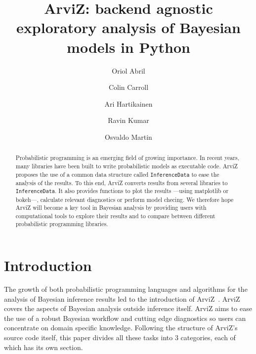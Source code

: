 \documentclass[anonymous=false, %
               format=acmsmall, %
               review=true, %
               screen=true, %
               nonacm=true]{acmart}
\begin{document}
\title{{ArviZ}: backend agnostic exploratory analysis of
{Bayesian} models in {Python}}

\author{Oriol Abril}

\author{Colin Carroll}

\author{Ari Hartikainen}

\author{Ravin Kumar}

\author{Osvaldo Martin}

\begin{abstract}
  Probabilistic programming is an emerging field of growing importance. In
  recent years, many libraries have been built to write probabilistic models
  as executable code. ArviZ proposes the use of a common data structure called
  \texttt{InferenceData} to ease the analysis of the results. To this end,
  ArviZ converts results from several libraries to
  \texttt{InferenceData}. It also provides functions to plot the results ---using
  matplotlib or bokeh---, calculate relevant diagnostics or perform model checing.
  We therefore hope ArviZ will become a key tool in Bayesian analysis by
  providing users with computational tools to explore their results and to
  compare between different probabilistic programming libraries.
\end{abstract}

\maketitle

\section{Introduction}
The growth of both probabilistic programming languages and algorithms for the
analysis of Bayesian inference results led to the introduction of
ArviZ~\cite{arviz2019}. ArviZ covers the aspects of Bayesian analysis outside
inference itself. ArviZ aims to ease the use of a robust Bayesian workflow and
cutting edge diagnostics so users can concentrate on domain specific
knowledge.
Following the structure of ArviZ's source code itself, this
paper divides all these tasks into 3 categories, each of which has its own
section.
\end{document}
